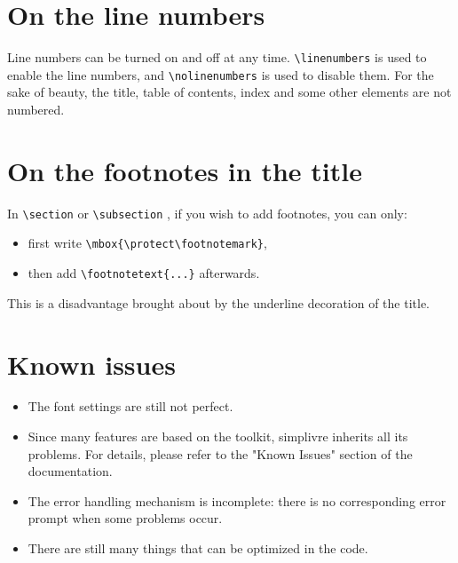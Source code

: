 \documentclass[puretext]{simplivre}
\providecommand{\simplivre}{\textsf{simplivre}}
\begin{document}

\section{On the line numbers}
Line numbers can be turned on and off at any time. \lstinline|\linenumbers| is used to enable the line numbers, and \lstinline|\nolinenumbers| is used to disable them. For the sake of beauty, the title, table of contents, index and some other elements are not numbered.

\section{On the footnotes in the title}
In \lstinline|\section| or \lstinline|\subsection| , if you wish to add footnotes, you can only:
\begin{itemize}
    \item first write \lstinline|\mbox{\protect\footnotemark}|, 
    \item then add \lstinline|\footnotetext{...}| afterwards. 
\end{itemize}
This is a disadvantage brought about by the underline decoration of the title.


\section{Known issues}

\begin{itemize}[itemsep=.6em]
    \item The font settings are still not perfect.
    \item Since many features are based on the \ProjLib{} toolkit, \simplivre{} inherits all its problems. For details, please refer to the "Known Issues" section of the \ProjLib{} documentation.
    \item The error handling mechanism is incomplete: there is no corresponding error prompt when some problems occur.
    \item There are still many things that can be optimized in the code.
\end{itemize}
\end{document}
